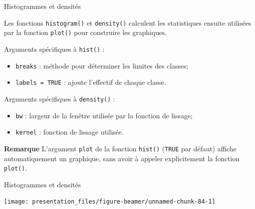 \documentclass[12pt,ignorenonframetext,handout,]{beamer}
\newenvironment{Shaded}{}{}
\newcommand{\DataTypeTok}[1]{#1}
\newcommand{\DecValTok}[1]{#1}
\newcommand{\KeywordTok}[1]{\textcolor[rgb]{0.00,0.00,1.00}{#1}}
\newcommand{\NormalTok}[1]{#1}
\newcommand{\OperatorTok}[1]{#1}
\newcommand{\OtherTok}[1]{\textcolor[rgb]{1.00,0.25,0.00}{#1}}
\newcommand{\StringTok}[1]{\textcolor[rgb]{0.00,0.50,0.50}{#1}}
\providecommand{\tightlist}{%
  \setlength{\itemsep}{0pt}\setlength{\parskip}{0pt}}
\renewenvironment{Shaded}{\begin{snugshade}}{\end{snugshade}}
\newcommand{\intertitre}[1]{\textcolor{redInsee}{\textbf{#1}}}
\begin{document}
\begin{frame}[fragile]{Histogrammes et densités}
\protect\hypertarget{histogrammes-et-densites}{}

Les fonctions \texttt{histogram()} et \texttt{density()} calculent les
statistiques ensuite utilisées par la fonction \texttt{plot()} pour
construire les graphiques.

\pause Arguments spécifiques à \texttt{hist()} : \vspace{-0.3cm}

\begin{itemize}
\tightlist
\item
  \texttt{breaks} : méthode pour déterminer les limites des classes;
\item
  \texttt{labels\ =\ TRUE} : ajoute l’effectif de chaque classe.
\end{itemize}

\pause Arguments spécifiques à \texttt{density()} : \vspace{-0.3cm}

\begin{itemize}
\tightlist
\item
  \texttt{bw} : largeur de la fenêtre utilisée par la fonction de
  lissage;
\item
  \texttt{kernel} : fonction de lissage utilisée.
\end{itemize}

\pause

\intertitre{Remarque} L’argument \texttt{plot} de la fonction
\texttt{hist()} (\texttt{TRUE} par défaut) affiche automatiquement un
graphique, sans avoir à appeler explicitement la fonction
\texttt{plot()}.

\end{frame}

\begin{frame}[fragile]{Histogrammes et densités}
\protect\hypertarget{histogrammes-et-densites-1}{}

\centering \footnotesize

\begin{Shaded}
\end{Shaded}

\texttt{[image: presentation\_files/figure-beamer/unnamed-chunk-84-1]}

\end{frame}
\end{document}
